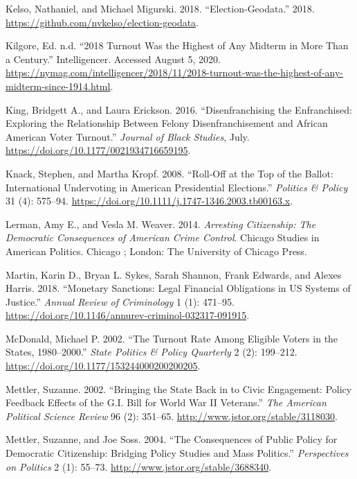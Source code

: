 \documentclass[
  12pt,
]{article}
\newlength{\cslhangindent}
\newenvironment{cslreferences}%
  {\setlength{\parindent}{0pt}%
  \everypar{\setlength{\hangindent}{\cslhangindent}}\ignorespaces}%
  {\par}
\begin{document}
\begin{cslreferences}
\leavevmode\hypertarget{ref-Kelso2018}{}%
Kelso, Nathaniel, and Michael Migurski. 2018. ``Election-Geodata.'' 2018. \url{https://github.com/nvkelso/election-geodata}.

\leavevmode\hypertarget{ref-Kilgore2018}{}%
Kilgore, Ed. n.d. ``2018 Turnout Was the Highest of Any Midterm in More Than a Century.'' Intelligencer. Accessed August 5, 2020. \url{https://nymag.com/intelligencer/2018/11/2018-turnout-was-the-highest-of-any-midterm-since-1914.html}.

\leavevmode\hypertarget{ref-King2016}{}%
King, Bridgett A., and Laura Erickson. 2016. ``Disenfranchising the Enfranchised: Exploring the Relationship Between Felony Disenfranchisement and African American Voter Turnout.'' \emph{Journal of Black Studies}, July. \url{https://doi.org/10.1177/0021934716659195}.

\leavevmode\hypertarget{ref-Knack2008}{}%
Knack, Stephen, and Martha Kropf. 2008. ``Roll-Off at the Top of the Ballot: International Undervoting in American Presidential Elections.'' \emph{Politics \& Policy} 31 (4): 575--94. \url{https://doi.org/10.1111/j.1747-1346.2003.tb00163.x}.

\leavevmode\hypertarget{ref-Lerman2014}{}%
Lerman, Amy E., and Vesla M. Weaver. 2014. \emph{Arresting Citizenship: The Democratic Consequences of American Crime Control}. Chicago Studies in American Politics. Chicago ; London: The University of Chicago Press.

\leavevmode\hypertarget{ref-Martin2018}{}%
Martin, Karin D., Bryan L. Sykes, Sarah Shannon, Frank Edwards, and Alexes Harris. 2018. ``Monetary Sanctions: Legal Financial Obligations in US Systems of Justice.'' \emph{Annual Review of Criminology} 1 (1): 471--95. \url{https://doi.org/10.1146/annurev-criminol-032317-091915}.

\leavevmode\hypertarget{ref-McDonald2002}{}%
McDonald, Michael P. 2002. ``The Turnout Rate Among Eligible Voters in the States, 1980--2000.'' \emph{State Politics \& Policy Quarterly} 2 (2): 199--212. \url{https://doi.org/10.1177/153244000200200205}.

\leavevmode\hypertarget{ref-Mettler2002}{}%
Mettler, Suzanne. 2002. ``Bringing the State Back in to Civic Engagement: Policy Feedback Effects of the G.I. Bill for World War II Veterans.'' \emph{The American Political Science Review} 96 (2): 351--65. \url{http://www.jstor.org/stable/3118030}.

\leavevmode\hypertarget{ref-Mettler2004}{}%
Mettler, Suzanne, and Joe Soss. 2004. ``The Consequences of Public Policy for Democratic Citizenship: Bridging Policy Studies and Mass Politics.'' \emph{Perspectives on Politics} 2 (1): 55--73. \url{http://www.jstor.org/stable/3688340}.


\end{cslreferences}
\end{document}

